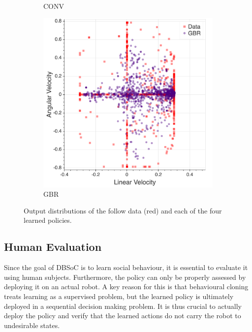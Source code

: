 \documentclass[letterpaper, 10 pt, conference]{ieeeconf}
\begin{document}
\begin{figure}[tbh]
\begin{subfigure}[b]{0.45\columnwidth}
    \caption{CONV}
    \label{fig:data3}
  \end{subfigure}
  \hspace{5mm}
  \begin{subfigure}[b]{0.45\columnwidth}
    \includegraphics[scale = 0.08]{images/gbr_dist.png}

    \caption{GBR}
       \label{fig:data4}
  \end{subfigure} 
  
  \caption{Output distributions of the follow data (red) and each of the four learned policies.}
  \vspace{-6mm}
  \label{fig:data}

  \end{figure}


\subsection{Human Evaluation}
Since the goal of DBSoC is to learn social behaviour, it is essential to evaluate it using human subjects.  Furthermore, the policy can only be properly assessed by deploying it on an actual robot.  A key reason for this is that behavioural cloning treats learning as a supervised problem, but the learned policy is ultimately deployed in a sequential decision making problem. It is thus crucial to actually deploy the policy and verify that the learned actions do not carry the robot to undesirable states.
\end{document}
